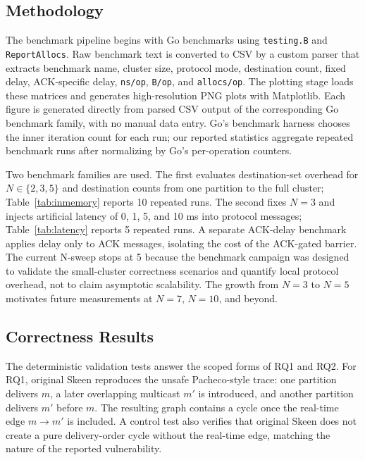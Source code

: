 \documentclass[conference]{IEEEtran}
\begin{document}
\subsection{Methodology}

The benchmark pipeline begins with Go benchmarks using \texttt{testing.B} and \texttt{ReportAllocs}. Raw benchmark text is converted to CSV by a custom parser that extracts benchmark name, cluster size, protocol mode, destination count, fixed delay, ACK-specific delay, \texttt{ns/op}, \texttt{B/op}, and \texttt{allocs/op}. The plotting stage loads these matrices and generates high-resolution PNG plots with Matplotlib. Each figure is generated directly from parsed CSV output of the corresponding Go benchmark family, with no manual data entry. Go's benchmark harness chooses the inner iteration count for each run; our reported statistics aggregate repeated benchmark runs after normalizing by Go's per-operation counters.

Two benchmark families are used. The first evaluates destination-set overhead for $N \in \{2,3,5\}$ and destination counts from one partition to the full cluster; Table~\ref{tab:inmemory} reports 10 repeated runs. The second fixes $N=3$ and injects artificial latency of 0, 1, 5, and 10 ms into protocol messages; Table~\ref{tab:latency} reports 5 repeated runs. A separate ACK-delay benchmark applies delay only to \textsc{ACK} messages, isolating the cost of the ACK-gated barrier. The current N-sweep stops at 5 because the benchmark campaign was designed to validate the small-cluster correctness scenarios and quantify local protocol overhead, not to claim asymptotic scalability. The growth from $N=3$ to $N=5$ motivates future measurements at $N=7$, $N=10$, and beyond.

\subsection{Correctness Results}

The deterministic validation tests answer the scoped forms of RQ1 and RQ2. For RQ1, original Skeen reproduces the unsafe Pacheco-style trace: one partition delivers $m$, a later overlapping multicast $m'$ is introduced, and another partition delivers $m'$ before $m$. The resulting graph contains a cycle once the real-time edge $m \rightarrow m'$ is included. A control test also verifies that original Skeen does not create a pure delivery-order cycle without the real-time edge, matching the nature of the reported vulnerability.
\end{document}
